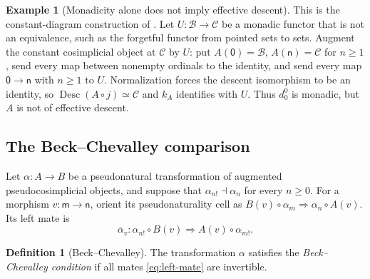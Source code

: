 \documentclass[11pt,a4paper]{article}
\numberwithin{equation}{section}
\theoremstyle{definition}
\newtheorem{definition}[definition]{Definition}
\newtheorem{example}[example]{Example}
\theoremstyle{remark}
\newcommand{\Desc}{\operatorname{Desc}}
\begin{document}
\begin{example}[Monadicity alone does not imply effective descent]
\label{ex:monadic-not-effective}
This is the constant-diagram construction of
\cite[Remark~4.5 and Lemma~4.6]{Nunes2021}.
Let $U\colon\mathcal B\to\mathcal C$ be a monadic functor that is
not an equivalence, such as the forgetful functor from pointed sets
to sets. Augment the constant cosimplicial object at $\mathcal C$
by $U$: put $A(\mathsf 0)=\mathcal B$, $A(\mathsf n)=\mathcal C$ for $n\geq1$,
send every map between nonempty ordinals to the identity, and send
every map $\mathsf0\to\mathsf n$ with $n\geq1$ to $U$.
Normalization forces the descent isomorphism to be an identity,
so $\Desc(A\circ j)\simeq\mathcal C$ and $k_A$ identifies with $U$.
Thus $d_0^0$ is monadic, but $A$ is not of effective descent.
\end{example}

\subsection{The Beck--Chevalley comparison}

Let $\alpha\colon A\to B$ be a pseudonatural transformation of
augmented pseudocosimplicial objects, and suppose that
$\alpha_{n!}\dashv\alpha_n$ for every $n\geq0$. For a morphism
$v\colon\mathsf m\to\mathsf n$, orient its pseudonaturality cell as
$B(v)\circ\alpha_m\Rightarrow\alpha_n\circ A(v)$. Its left mate is
\begin{equation}
  \overline\alpha_v\colon
  \alpha_{n!}\circ B(v)\Longrightarrow A(v)\circ\alpha_{m!}.
  \label{eq:left-mate}
\end{equation}

\begin{definition}[Beck--Chevalley]
\label{def:BC}
The transformation $\alpha$ satisfies the \emph{Beck--Chevalley
condition} if all mates \eqref{eq:left-mate} are invertible.
\end{definition}
\end{document}
